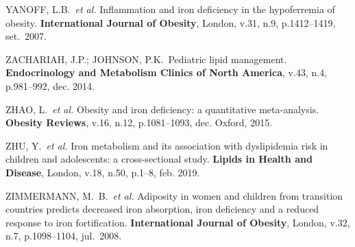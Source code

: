 \noindent YANOFF, L.B.\ \textit{et al.} Inflammation and iron deficiency in the hypoferremia of obesity. \textbf{International Journal of Obesity}, London, v.31, n.9, p.1412–1419, set.\ 2007. 

\bigbreak

\noindent ZACHARIAH, J.P.; JOHNSON, P.K.\ Pediatric lipid management. \textbf{Endocrinology and Metabolism Clinics of North America}, v.43, n.4, p.981--992, dec. 2014.

\bigbreak

\noindent ZHAO, L.\ \textit{et al.} Obesity and iron deficiency: a quantitative meta-analysis. \textbf{Obesity Reviews}, v.16, n.12, p.1081–1093, dec. Oxford, 2015. 

\bigbreak

\noindent ZHU, Y.\ \textit{et al.} Iron metabolism and its association with dyslipidemia risk in children and adolescents: a cross-sectional study. \textbf{Lipids in Health and Disease}, London, v.18, n.50, p.1--8, feb. 2019.

\bigbreak

\noindent ZIMMERMANN, M.\ B.\ \textit{et al.} Adiposity in women and children from transition countries predicts decreased iron absorption, iron deficiency and a reduced response to iron fortification. \textbf{International Journal of Obesity}, London, v.32, n.7, p.1098--1104, jul.\ 2008.
